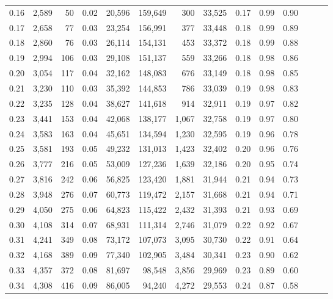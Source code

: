 \begin{tabular}{rrrrrrrrrrrrrr}
0.16 &  2,589 &   50 &  0.02 &   20,596 &  159,649 &     300 &  33,525 &  0.17 &  0.99 &      0.90 \\
0.17 &  2,658 &   77 &  0.03 &   23,254 &  156,991 &     377 &  33,448 &  0.18 &  0.99 &      0.89 \\
0.18 &  2,860 &   76 &  0.03 &   26,114 &  154,131 &     453 &  33,372 &  0.18 &  0.99 &      0.88 \\
0.19 &  2,994 &  106 &  0.03 &   29,108 &  151,137 &     559 &  33,266 &  0.18 &  0.98 &      0.86 \\
0.20 &  3,054 &  117 &  0.04 &   32,162 &  148,083 &     676 &  33,149 &  0.18 &  0.98 &      0.85 \\
0.21 &  3,230 &  110 &  0.03 &   35,392 &  144,853 &     786 &  33,039 &  0.19 &  0.98 &      0.83 \\
0.22 &  3,235 &  128 &  0.04 &   38,627 &  141,618 &     914 &  32,911 &  0.19 &  0.97 &      0.82 \\
0.23 &  3,441 &  153 &  0.04 &   42,068 &  138,177 &   1,067 &  32,758 &  0.19 &  0.97 &      0.80 \\
0.24 &  3,583 &  163 &  0.04 &   45,651 &  134,594 &   1,230 &  32,595 &  0.19 &  0.96 &      0.78 \\
0.25 &  3,581 &  193 &  0.05 &   49,232 &  131,013 &   1,423 &  32,402 &  0.20 &  0.96 &      0.76 \\
0.26 &  3,777 &  216 &  0.05 &   53,009 &  127,236 &   1,639 &  32,186 &  0.20 &  0.95 &      0.74 \\
0.27 &  3,816 &  242 &  0.06 &   56,825 &  123,420 &   1,881 &  31,944 &  0.21 &  0.94 &      0.73 \\
0.28 &  3,948 &  276 &  0.07 &   60,773 &  119,472 &   2,157 &  31,668 &  0.21 &  0.94 &      0.71 \\
0.29 &  4,050 &  275 &  0.06 &   64,823 &  115,422 &   2,432 &  31,393 &  0.21 &  0.93 &      0.69 \\
0.30 &  4,108 &  314 &  0.07 &   68,931 &  111,314 &   2,746 &  31,079 &  0.22 &  0.92 &      0.67 \\
0.31 &  4,241 &  349 &  0.08 &   73,172 &  107,073 &   3,095 &  30,730 &  0.22 &  0.91 &      0.64 \\
0.32 &  4,168 &  389 &  0.09 &   77,340 &  102,905 &   3,484 &  30,341 &  0.23 &  0.90 &      0.62 \\
0.33 &  4,357 &  372 &  0.08 &   81,697 &   98,548 &   3,856 &  29,969 &  0.23 &  0.89 &      0.60 \\
0.34 &  4,308 &  416 &  0.09 &   86,005 &   94,240 &   4,272 &  29,553 &  0.24 &  0.87 &      0.58 \\

\end{tabular}
